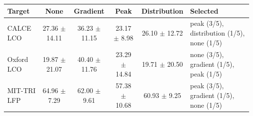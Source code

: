 \begin{tabular}{lccccl}
\toprule
Target & None & Gradient & Peak & Distribution & Selected \\
\midrule
CALCE LCO & 27.36 $\pm$ 14.11 & 36.23 $\pm$ 11.15 & 23.17 $\pm$ 8.98 & 26.10 $\pm$ 12.72 & peak (3/5), distribution (1/5), none (1/5) \\
Oxford LCO & 19.87 $\pm$ 21.07 & 40.40 $\pm$ 11.76 & 23.29 $\pm$ 14.84 & 19.71 $\pm$ 20.50 & none (3/5), gradient (1/5), peak (1/5) \\
MIT-TRI LFP & 64.96 $\pm$ 7.29 & 62.00 $\pm$ 9.61 & 57.38 $\pm$ 10.68 & 60.93 $\pm$ 9.25 & peak (3/5), gradient (1/5), none (1/5) \\
\bottomrule
\end{tabular}
